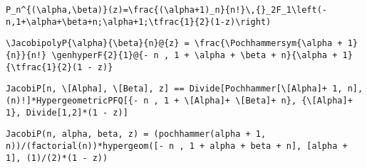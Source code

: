 \newsavebox\CSMM
\begin{lrbox}{\CSMM}
 \begin{minipage}[t]{0.82\textwidth}
  \lstinline[language={[latex]TeX},mathescape,breaklines=true]""
 \end{minipage}
\end{lrbox}
\newsavebox\CSMA
\begin{lrbox}{\CSMA}
 \begin{minipage}[t]{0.82\textwidth}
  \lstinline[language={[latex]TeX},mathescape,breaklines=true]""
 \end{minipage}
\end{lrbox}
\newsavebox\CTT
\begin{lrbox}{\CTT}
 \begin{minipage}[t]{0.82\textwidth}
  \lstinline[language={[latex]TeX},mathescape,breaklines=true]"P_n^{(\alpha,\beta)}(z)=\frac{(\alpha+1)_n}{n!}\,{}_2F_1\left(-n,1+\alpha+\beta+n;\alpha+1;\tfrac{1}{2}(1-z)\right)"
 \end{minipage}
\end{lrbox}
\newsavebox\CTST
\begin{lrbox}{\CTST}
 \begin{minipage}[t]{0.82\textwidth}
  \lstinline[language={[latex]TeX},mathescape,breaklines=true]"\JacobipolyP{\alpha}{\beta}{n}@{z} = \frac{\Pochhammersym{\alpha + 1}{n}}{n!} \genhyperF{2}{1}@{- n , 1 + \alpha + \beta + n}{\alpha + 1}{\tfrac{1}{2}(1 - z)}"
 \end{minipage}
\end{lrbox}
\newsavebox\CTMM
\begin{lrbox}{\CTMM}
 \begin{minipage}[t]{0.82\textwidth}
  \lstinline[language={[latex]TeX},mathescape,breaklines=true]"JacobiP[n, \[Alpha], \[Beta], z] == Divide[Pochhammer[\[Alpha]+ 1, n],(n)!]*HypergeometricPFQ[{- n , 1 + \[Alpha]+ \[Beta]+ n}, {\[Alpha]+ 1}, Divide[1,2]*(1 - z)]"
 \end{minipage}
\end{lrbox}
\newsavebox\CTMA
\begin{lrbox}{\CTMA}
 \begin{minipage}[t]{0.82\textwidth}
  \lstinline[language={[latex]TeX},mathescape,breaklines=true]"JacobiP(n, alpha, beta, z) = (pochhammer(alpha + 1, n))/(factorial(n))*hypergeom([- n , 1 + alpha + beta + n], [alpha + 1], (1)/(2)*(1 - z))"
 \end{minipage}
\end{lrbox}
